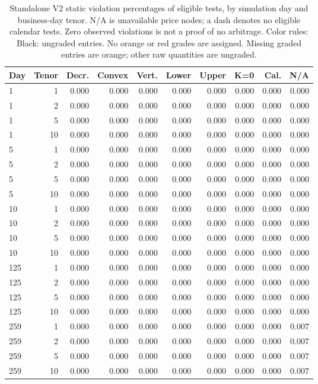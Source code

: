 \documentclass[11pt]{article}
\begin{document}
\begin{table}[H]\centering\small\setlength{\tabcolsep}{4pt}
\caption{Standalone V2 static violation percentages of eligible tests, by simulation day and business-day tenor. N/A is unavailable price nodes; a dash denotes no eligible calendar tests. Zero observed violations is not a proof of no arbitrage. Color rules: Black: ungraded entries. No orange or red grades are assigned. Missing graded entries are orange; other raw quantities are ungraded.}\label{tab:standalone-v2-static}
\begin{tabular}{@{}lrrrrrrrrr@{}}
\toprule
Day & Tenor & Decr. & Convex & Vert. & Lower & Upper & K=0 & Cal. & N/A \\
\midrule
1 & 1 & 0.000 & 0.000 & 0.000 & 0.000 & 0.000 & 0.000 & 0.000 & 0.000 \\
1 & 2 & 0.000 & 0.000 & 0.000 & 0.000 & 0.000 & 0.000 & 0.000 & 0.000 \\
1 & 5 & 0.000 & 0.000 & 0.000 & 0.000 & 0.000 & 0.000 & 0.000 & 0.000 \\
1 & 10 & 0.000 & 0.000 & 0.000 & 0.000 & 0.000 & 0.000 & 0.000 & 0.000 \\
5 & 1 & 0.000 & 0.000 & 0.000 & 0.000 & 0.000 & 0.000 & 0.000 & 0.000 \\
5 & 2 & 0.000 & 0.000 & 0.000 & 0.000 & 0.000 & 0.000 & 0.000 & 0.000 \\
5 & 5 & 0.000 & 0.000 & 0.000 & 0.000 & 0.000 & 0.000 & 0.000 & 0.000 \\
5 & 10 & 0.000 & 0.000 & 0.000 & 0.000 & 0.000 & 0.000 & 0.000 & 0.000 \\
10 & 1 & 0.000 & 0.000 & 0.000 & 0.000 & 0.000 & 0.000 & 0.000 & 0.000 \\
10 & 2 & 0.000 & 0.000 & 0.000 & 0.000 & 0.000 & 0.000 & 0.000 & 0.000 \\
10 & 5 & 0.000 & 0.000 & 0.000 & 0.000 & 0.000 & 0.000 & 0.000 & 0.000 \\
10 & 10 & 0.000 & 0.000 & 0.000 & 0.000 & 0.000 & 0.000 & 0.000 & 0.000 \\
125 & 1 & 0.000 & 0.000 & 0.000 & 0.000 & 0.000 & 0.000 & 0.000 & 0.000 \\
125 & 2 & 0.000 & 0.000 & 0.000 & 0.000 & 0.000 & 0.000 & 0.000 & 0.000 \\
125 & 5 & 0.000 & 0.000 & 0.000 & 0.000 & 0.000 & 0.000 & 0.000 & 0.000 \\
125 & 10 & 0.000 & 0.000 & 0.000 & 0.000 & 0.000 & 0.000 & 0.000 & 0.000 \\
259 & 1 & 0.000 & 0.000 & 0.000 & 0.000 & 0.000 & 0.000 & 0.000 & 0.007 \\
259 & 2 & 0.000 & 0.000 & 0.000 & 0.000 & 0.000 & 0.000 & 0.000 & 0.007 \\
259 & 5 & 0.000 & 0.000 & 0.000 & 0.000 & 0.000 & 0.000 & 0.000 & 0.007 \\
259 & 10 & 0.000 & 0.000 & 0.000 & 0.000 & 0.000 & 0.000 & 0.000 & 0.007 \\
\bottomrule\end{tabular}\end{table}
\end{document}
